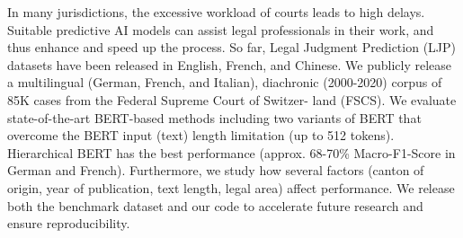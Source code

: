 In many jurisdictions, the excessive workload of courts leads to high delays. Suitable predictive AI models can assist legal professionals in their work, and thus enhance and speed up the process. So far, Legal Judgment Prediction (LJP) datasets have been released in English, French, and Chinese. We publicly release a multilingual (German, French, and Italian), diachronic (2000-2020) corpus of 85K cases from the Federal Supreme Court of Switzer- land (FSCS). We evaluate state-of-the-art BERT-based methods including two variants of BERT that overcome the BERT input (text) length limitation (up to 512 tokens). Hierarchical BERT has the best performance (approx. 68-70\% Macro-F1-Score in German and French). Furthermore, we study how several factors (canton of origin, year of publication, text length, legal area) affect performance. We release both the benchmark dataset and our code to accelerate future research and ensure reproducibility.
